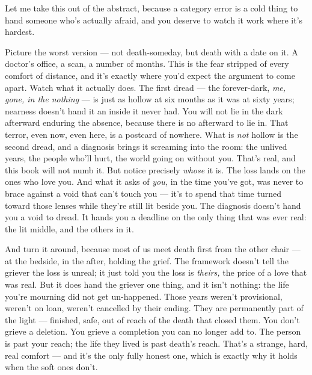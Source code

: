 \documentclass[11pt,openany]{book}
\begin{document}
Let me take this out of the abstract, because a category error is a cold thing to hand someone who’s actually afraid, and you deserve to watch it work where it’s hardest.

Picture the worst version — not death-someday, but death with a date on it. A doctor’s office, a scan, a number of months. This is the fear stripped of every comfort of distance, and it’s exactly where you’d expect the argument to come apart. Watch what it actually does. The first dread — the forever-dark, \textit{me, gone, in the nothing} — is just as hollow at six months as it was at sixty years; nearness doesn’t hand it an inside it never had. You will not lie in the dark afterward enduring the absence, because there is no afterward to lie in. That terror, even now, even here, is a postcard of nowhere. What is \textit{not} hollow is the second dread, and a diagnosis brings it screaming into the room: the unlived years, the people who’ll hurt, the world going on without you. That’s real, and this book will not numb it. But notice precisely \textit{whose} it is. The loss lands on the ones who love you. And what it asks of \textit{you,} in the time you’ve got, was never to brace against a void that can’t touch you — it’s to spend that time turned toward those lenses while they’re still lit beside you. The diagnosis doesn’t hand you a void to dread. It hands you a deadline on the only thing that was ever real: the lit middle, and the others in it.

And turn it around, because most of us meet death first from the other chair — at the bedside, in the after, holding the grief. The framework doesn’t tell the griever the loss is unreal; it just told you the loss is \textit{theirs,} the price of a love that was real. But it does hand the griever one thing, and it isn’t nothing: the life you’re mourning did not get un-happened. Those years weren’t provisional, weren’t on loan, weren’t cancelled by their ending. They are permanently part of the light — finished, safe, out of reach of the death that closed them. You don’t grieve a deletion. You grieve a completion you can no longer add to. The person is past your reach; the life they lived is past death’s reach. That’s a strange, hard, real comfort — and it’s the only fully honest one, which is exactly why it holds when the soft ones don’t.
\end{document}
